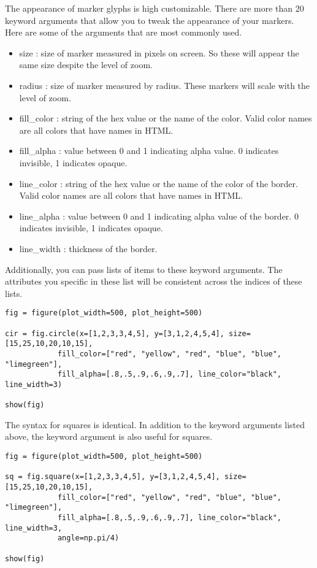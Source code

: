 The appearance of marker glyphs is high customizable. There are more than 20 keyword
arguments that allow you to tweak the appearance of your markers. Here are some
of the arguments that are most commonly used.

\begin{itemize}
    \item size : size of marker measured in pixels on screen. So these will
        appear the same size despite the level of zoom.
    \item radius : size of marker measured by radius. These markers will scale
        with the level of zoom.
    \item fill\_color : string of the hex value or the name of the
        color. Valid color names are all colors that have names in HTML.
    \item fill\_alpha : value between 0 and 1 indicating alpha value. 0 indicates
        invisible, 1 indicates opaque.
    \item line\_color : string of the hex value or the name of the
        color of the border. Valid color names are all colors that have
        names in HTML.
    \item line\_alpha : value between 0 and 1 indicating alpha value of the
        border. 0 indicates invisible, 1 indicates opaque.
    \item line\_width : thickness of the border.
\end{itemize}

Additionally, you can pass lists of items to these keyword arguments. The
attributes you specific in these list will be consistent across the indices of
these lists.

\begin{lstlisting}
fig = figure(plot_width=500, plot_height=500)

cir = fig.circle(x=[1,2,3,3,4,5], y=[3,1,2,4,5,4], size=[15,25,10,20,10,15],
            fill_color=["red", "yellow", "red", "blue", "blue", "limegreen"],
            fill_alpha=[.8,.5,.9,.6,.9,.7], line_color="black", line_width=3)

show(fig)
\end{lstlisting}

The syntax for squares is identical. In addition to the keyword arguments listed
above, the  keyword argument is also useful for squares.

\begin{lstlisting}
fig = figure(plot_width=500, plot_height=500)

sq = fig.square(x=[1,2,3,3,4,5], y=[3,1,2,4,5,4], size=[15,25,10,20,10,15],
            fill_color=["red", "yellow", "red", "blue", "blue", "limegreen"],
            fill_alpha=[.8,.5,.9,.6,.9,.7], line_color="black", line_width=3,
            angle=np.pi/4)

show(fig)
\end{lstlisting}


